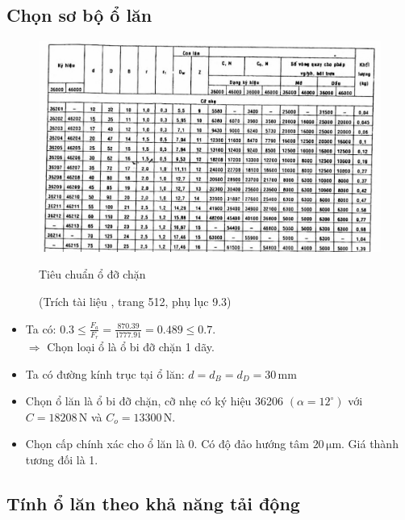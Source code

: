         \subsection{Chọn sơ bộ ổ lăn}
            \begin{figure}[H]
                \centering
                \includegraphics[width=1\textwidth]{pictures/bearing_standard_II.png}
                \caption{Tiêu chuẩn ổ đỡ chặn}
                \caption*{\footnotesize(Trích tài liệu \cite{btctm}, trang 512, phụ lục 9.3)}
            \end{figure}
            \begin{itemize}
                \item Ta có: $0.3 \leq \frac{F_a}{F_r} = \frac{870.39}{1777.91} = 0.489 \leq 0.7$. \\[0.3cm]
                    $\Rightarrow$ Chọn loại ổ là ổ bi đỡ chặn 1 dãy.
                \item Ta có đường kính trục tại ổ lăn: $d = d_{B} = d_{D} = 30\, \mathrm{mm}$
                \item Chọn ổ lăn là ổ bi đỡ chặn, cỡ nhẹ có ký hiệu 36206  $(\alpha = 12 ^\circ)$ với $C = 18208\, \mathrm{N}$ và $C_o = 13300\, \mathrm{N}$.
                \item Chọn cấp chính xác cho ổ lăn là 0. Có độ đảo hướng tâm $20\, \mathrm{\mu m}$. Giá thành tương đối là 1.
            \end{itemize}
        \subsection{Tính ổ lăn theo khả năng tải động}
